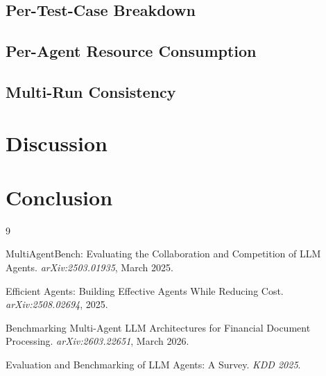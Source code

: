 \documentclass[11pt, a4paper]{article}
\begin{document}
\subsection{Per-Test-Case Breakdown}


\subsection{Per-Agent Resource Consumption}


\subsection{Multi-Run Consistency}


\section{Discussion}


\section{Conclusion}


\begin{thebibliography}{9}

  MultiAgentBench: Evaluating the Collaboration and Competition of LLM Agents.
  \textit{arXiv:2503.01935}, March 2025.

  Efficient Agents: Building Effective Agents While Reducing Cost.
  \textit{arXiv:2508.02694}, 2025.

  Benchmarking Multi-Agent LLM Architectures for Financial Document Processing.
  \textit{arXiv:2603.22651}, March 2026.

  Evaluation and Benchmarking of LLM Agents: A Survey.
  \textit{KDD 2025}.

\end{thebibliography}
\end{document}
